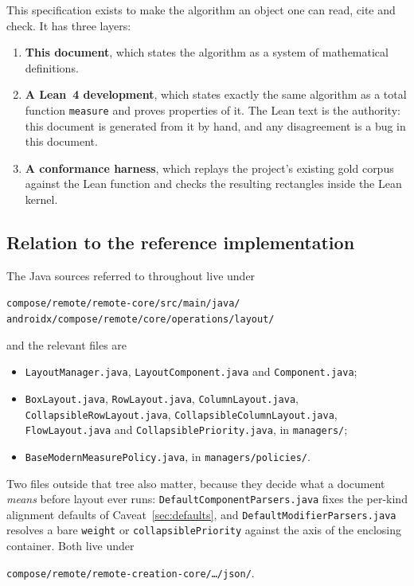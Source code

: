 \documentclass[11pt,a4paper]{article}
\newcommand{\lo}[1]{\texttt{#1}}       %
\newcommand{\jv}[1]{\texttt{#1}}       %
\newcommand{\file}[1]{\texttt{#1}}
\theoremstyle{definition}
\theoremstyle{plain}
\theoremstyle{remark}
\begin{document}
This specification exists to make the algorithm an object one can read, cite and
check. It has three layers:

\begin{enumerate}[leftmargin=1.6em]
  \item \textbf{This document}, which states the algorithm as a system of
    mathematical definitions.
  \item \textbf{A Lean~4 development}, which states exactly the same algorithm
    as a total function \lo{measure} and proves properties of it. The Lean text
    is the authority: this document is generated from it by hand, and any
    disagreement is a bug in this document.
  \item \textbf{A conformance harness}, which replays the project's existing
    gold corpus against the Lean function and checks the resulting rectangles
    inside the Lean kernel.
\end{enumerate}

\subsection{Relation to the reference implementation}

The Java sources referred to throughout live under
\begin{center}
\file{compose/remote/remote-core/src/main/java/} \\
\file{androidx/compose/remote/core/operations/layout/}
\end{center}
and the relevant files are
\begin{itemize}[leftmargin=1.6em,itemsep=0pt,topsep=4pt]
  \item \jv{LayoutManager.java}, \jv{LayoutComponent.java} and
    \jv{Component.java};
  \item \jv{BoxLayout.java}, \jv{RowLayout.java}, \jv{ColumnLayout.java},
    \jv{CollapsibleRowLayout.java}, \jv{CollapsibleColumnLayout.java},
    \jv{FlowLayout.java} and \jv{CollapsiblePriority.java}, in \jv{managers/};
  \item \jv{BaseModernMeasurePolicy.java}, in \jv{managers/policies/}.
\end{itemize}
Two files outside that tree also matter, because they decide what a document
\emph{means} before layout ever runs: \jv{DefaultComponentParsers.java} fixes the
per-kind alignment defaults of Caveat~\ref{sec:defaults}, and
\jv{DefaultModifierParsers.java} resolves a bare \jv{weight} or
\jv{collapsiblePriority} against the axis of the enclosing container. Both live
under
\begin{center}
\file{compose/remote/remote-creation-core/\ldots/json/}.
\end{center}
\end{document}
